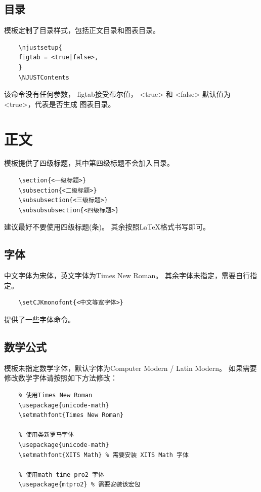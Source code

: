 \subsection{目录}
模板定制了目录样式，包括正文目录和图表目录。
\begin{lstlisting}
    \njustsetup{
    figtab = <true|false>,
    }
    \NJUSTContents
\end{lstlisting}
该命令没有任何参数，
{\ttfamily figtab}接受布尔值，
{\ttfamily <true>} 和 {\ttfamily <false>}
默认值为{\ttfamily <true>}，代表是否生成
图表目录。

\section{正文}
模板提供了四级标题，其中第四级标题不会加入目录。
\begin{lstlisting}
    \section{<一级标题>}
    \subsection{<二级标题>}
    \subsubsection{<三级标题>}
    \subsubsubsection{<四级标题>}
\end{lstlisting}
建议最好不要使用四级标题(条)。
其余按照\LaTeX{}格式书写即可。

\subsection{字体}
中文字体为宋体，英文字体为Times New Roman。
其余字体未指定，需要自行指定。
\begin{lstlisting}
    \setCJKmonofont{<中文等宽字体>}
\end{lstlisting}

提供了一些字体命令。

\subsection{数学公式}
模板未指定数学字体，默认字体为{\ttfamily Computer Modern / Latin Modern}。
如果需要修改数学字体请按照如下方法修改：
\begin{lstlisting}
    % 使用Times New Roman
    \usepackage{unicode-math}
    \setmathfont{Times New Roman}

    % 使用类新罗马字体
    \usepackage{unicode-math}
    \setmathfont{XITS Math} % 需要安装 XITS Math 字体
    
    % 使用math time pro2 字体
    \usepackage{mtpro2} % 需要安装该宏包
\end{lstlisting}

